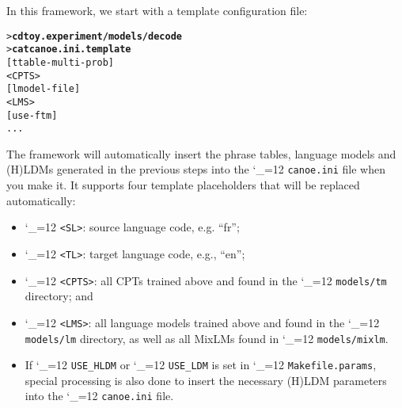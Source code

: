 \documentclass[11pt,letterpaper]{article}
\def\code{\begingroup\catcode`\_=12 \codex}
\newcommand{\codex}[1]{\texttt{#1}\endgroup}
\begin{document}
In this framework, we start with a template configuration file:
\begin{small}
\begin{alltt}
   > \textbf{cd toy.experiment/models/decode}
   > \textbf{cat canoe.ini.template}
   [ttable-multi-prob]
     <CPTS>
   [lmodel-file]
     <LMS>
   [use-ftm]
   ...
\end{alltt}
\end{small}

The framework will automatically insert the phrase tables, language models
and (H)LDMs generated in the previous steps into the \code{canoe.ini} file when
you make it.  It supports four template placeholders that will be replaced
automatically:
\begin{itemize}
\item \code{<SL>}:   source language code, e.g. ``fr'';
\item \code{<TL>}:   target language code, e.g., ``en'';
\item \code{<CPTS>}: all CPTs trained above and found in the
                     \code{models/tm} directory; and
\item \code{<LMS>}:  all language models trained above and found in
                     the \code{models/lm} directory, as well as all MixLMs found
                     in \code{models/mixlm}.
\item If \code{USE_HLDM} or \code{USE_LDM} is set in \code{Makefile.params},
special processing is also done to insert the necessary (H)LDM parameters into
the \code{canoe.ini} file.
\end{itemize}
\end{document}
